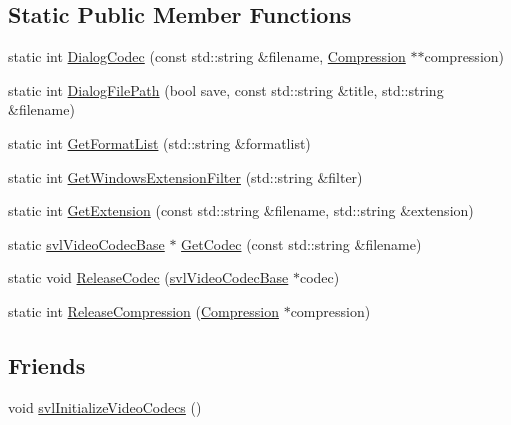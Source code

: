 \subsection*{Static Public Member Functions}
\begin{DoxyCompactItemize}
\item 
static int \hyperlink{classsvl_video_i_o_aafee8df80c7830e8af4801d150799f87}{Dialog\-Codec} (const std\-::string \&filename, \hyperlink{classsvl_video_i_o_a932d071ec9be4fefde824ab9b9125282}{Compression} $\ast$$\ast$compression)
\item 
static int \hyperlink{classsvl_video_i_o_a18e44abea35da502f090ac595d04e30e}{Dialog\-File\-Path} (bool save, const std\-::string \&title, std\-::string \&filename)
\item 
static int \hyperlink{classsvl_video_i_o_aca352855266bbea4ea91f373dfe18a3d}{Get\-Format\-List} (std\-::string \&formatlist)
\item 
static int \hyperlink{classsvl_video_i_o_a8c47774e2f28ce0dbcf84092e5b79387}{Get\-Windows\-Extension\-Filter} (std\-::string \&filter)
\item 
static int \hyperlink{classsvl_video_i_o_afdf17eb75f0134fd6a2c76bd63dcd92e}{Get\-Extension} (const std\-::string \&filename, std\-::string \&extension)
\item 
static \hyperlink{classsvl_video_codec_base}{svl\-Video\-Codec\-Base} $\ast$ \hyperlink{classsvl_video_i_o_a4d73c788b036ed84b2ff64908bfc7824}{Get\-Codec} (const std\-::string \&filename)
\item 
static void \hyperlink{classsvl_video_i_o_a7963cfd278c6270427de8360d53c828b}{Release\-Codec} (\hyperlink{classsvl_video_codec_base}{svl\-Video\-Codec\-Base} $\ast$codec)
\item 
static int \hyperlink{classsvl_video_i_o_a8f7f857fa7d45c9ea24b1d632c9bb4f9}{Release\-Compression} (\hyperlink{classsvl_video_i_o_a932d071ec9be4fefde824ab9b9125282}{Compression} $\ast$compression)
\end{DoxyCompactItemize}
\subsection*{Friends}
\begin{DoxyCompactItemize}
\item 
void \hyperlink{classsvl_video_i_o_a56ef4f6bb06b1dd81e565ac7bc110cbf}{svl\-Initialize\-Video\-Codecs} ()
\end{DoxyCompactItemize}


